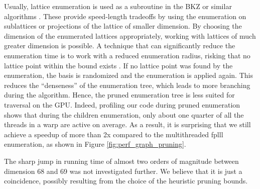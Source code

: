 \documentclass{scrartcl}
\begin{document}
    Usually, lattice enumeration is used as a subroutine in the BKZ or similar algorithms \cite{bkz}. 
    These provide speed-length tradeoffs by using the enumeration on sublattices or projections of the lattice of smaller dimension. 
    By choosing the dimension of the enumerated lattices appropriately, working with lattices of much greater dimension is possible. 
    A technique that can significantly reduce the enumeration time is to work with a reduced enumeration radius, risking that no lattice point within the bound exists \cite{pruning, bkz2}. 
    If no lattice point was found by the enumeration, the basis is randomized and the enumeration is applied again. 
    This reduces the ``denseness'' of the enumeration tree, which leads to more branching during the algorithm. 
    Hence, the pruned enumeration tree is less suited for traversal on the GPU. 
    Indeed, profiling our code during pruned enumeration shows that during the children enumeration, only about one quarter of all the threads in a warp are active on average.
    As a result, it is surprising that we still achieve a speedup of more than 2x compared to the multithreaded fplll enumeration, as shown in Figure \ref{fig:perf_graph_pruning}.

    The sharp jump in running time of almost two orders of magnitude between dimension 68 and 69 was not investigated further.
    We believe that it is just a coincidence, possibly resulting from the choice of the heuristic pruning bounds.
\end{document}
